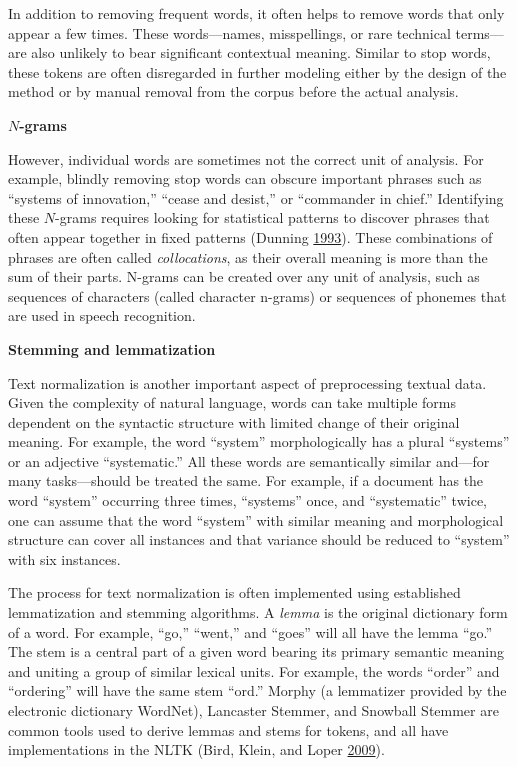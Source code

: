\documentclass[]{krantz}
\begin{document}
In addition to removing frequent words, it often helps to remove words
that only appear a few times. These words---names, misspellings, or rare
technical terms---are also unlikely to bear significant contextual
meaning. Similar to stop words, these tokens are often disregarded in
further modeling either by the design of the method or by manual removal
from the corpus before the actual analysis.

\textbf{\(N\)-grams}

However, individual words are sometimes not the correct unit of
analysis. For example, blindly removing stop words can obscure important
phrases such as ``systems of innovation,'' ``cease and desist,'' or
``commander in chief.'' Identifying these \(N\)-grams requires looking
for statistical patterns to discover phrases that often appear together
in fixed patterns (Dunning \protect\hyperlink{ref-Dunning-93}{1993}).
These combinations of phrases are often called \emph{collocations}, as
their overall meaning is more than the sum of their parts. N-grams can
be created over any unit of analysis, such as sequences of characters
(called character n-grams) or sequences of phonemes that are used in
speech recognition.

\textbf{Stemming and lemmatization}

Text normalization is another important aspect of preprocessing textual
data. Given the complexity of natural language, words can take multiple
forms dependent on the syntactic structure with limited change of their
original meaning. For example, the word ``system'' morphologically has a
plural ``systems'' or an adjective ``systematic.'' All these words are
semantically similar and---for many tasks---should be treated the same.
For example, if a document has the word ``system'' occurring three
times, ``systems'' once, and ``systematic'' twice, one can assume that
the word ``system'' with similar meaning and morphological structure can
cover all instances and that variance should be reduced to ``system''
with six instances.

The process for text normalization is often implemented using
established lemmatization and stemming algorithms. A \emph{lemma} is the
original dictionary form of a word. For example, ``go,'' ``went,'' and
``goes'' will all have the lemma ``go.'' The stem is a central part of a
given word bearing its primary semantic meaning and uniting a group of
similar lexical units. For example, the words ``order'' and ``ordering''
will have the same stem ``ord.'' Morphy (a lemmatizer provided by the
electronic dictionary WordNet), Lancaster Stemmer, and Snowball Stemmer
are common tools used to derive lemmas and stems for tokens, and all
have implementations in the NLTK (Bird, Klein, and Loper
\protect\hyperlink{ref-bird-09}{2009}).
\end{document}
